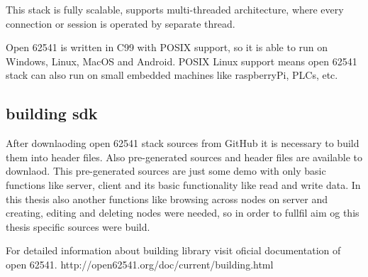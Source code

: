 This stack is fully scalable, supports multi-threaded architecture, where every connection or session is operated by separate thread.

Open 62541 is written in C99 with POSIX support, so it is able to run on Windows, Linux, MacOS and Android. POSIX Linux support means open 62541 stack can also run on small embedded machines like raspberryPi, PLCs, etc.


\subsection{building sdk}
After downlaoding open 62541 stack sources from GitHub it is necessary to build them into header files. Also pre-generated sources and header files are available to downlaod. This pre-generated sources are just some demo with only basic functions like server, client and its basic functionality like read and write data. In this thesis also another functions like browsing across nodes on server and creating, editing and deleting nodes were needed, so in order to fullfil aim og this thesis specific sources were build. 

For detailed information about building library visit oficial documentation of open 62541.
http://open62541.org/doc/current/building.html





